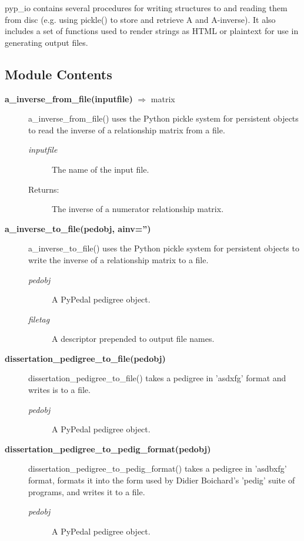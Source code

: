 pyp\_io contains several procedures for writing structures to and reading them from disc (e.g. using pickle() to store and retrieve A and A-inverse). It also includes a set of functions used to render strings as HTML or plaintext for use in generating output files.

\subsection*{Module Contents}

\begin{description}
\item[\textbf{a\_inverse\_from\_file(inputfile)} $\Rightarrow$ matrix]
a\_inverse\_from\_file() uses the Python pickle system for persistent objects to read the inverse of a relationship matrix from a file.
\begin{description}
\item[\emph{inputfile}] The name of the input file.
\item[Returns:] The inverse of a numerator relationship matrix.
\end{description}

\item[\textbf{a\_inverse\_to\_file(pedobj, ainv='')}]
a\_inverse\_to\_file() uses the Python pickle system for persistent objects to write the inverse of a relationship matrix to a file.
\begin{description}
\item[\emph{pedobj}] A PyPedal pedigree object.
\item[\emph{filetag}] A descriptor prepended to output file names.
\end{description}

\item[\textbf{dissertation\_pedigree\_to\_file(pedobj)}]
dissertation\_pedigree\_to\_file() takes a pedigree in 'asdxfg' format and writes is to a file.
\begin{description}
\item[\emph{pedobj}] A PyPedal pedigree object.
\end{description}

\item[\textbf{dissertation\_pedigree\_to\_pedig\_format(pedobj)}]
dissertation\_pedigree\_to\_pedig\_format() takes a pedigree in 'asdbxfg' format, formats it into the form used by Didier Boichard's 'pedig' suite of programs, and writes it to a file.
\begin{description}
\item[\emph{pedobj}] A PyPedal pedigree object.
\end{description}


\end{description}
